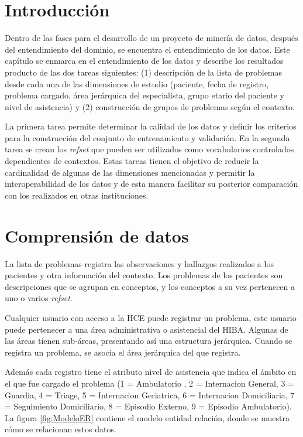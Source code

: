 \section{Introducción}
Dentro de las fases para el desarrollo de un proyecto de minería de datos, después del entendimiento del dominio, se encuentra el entendimiento de los datos. Este capítulo se enmarca en el entendimiento de los datos y describe los resultados producto de las dos tareas siguientes: (1) descripción de la lista de problemas desde cada una de las dimensiones de estudio (paciente, fecha de registro, problema cargado, área jerárquica del especialista, grupo etario del paciente y nivel de asistencia) y (2) construcción de grupos de problemas según el contexto. 

La primera tarea permite determinar la calidad de los datos y definir los criterios para la construcción del conjunto de entrenamiento y validación. En la segunda tarea se crean los \textit{\acrshort{refset}} que pueden ser utilizados como vocabularios controlados dependientes de contextos. Estas tareas  tienen el objetivo de reducir la cardinalidad de algunas de las dimensiones mencionadas y permitir la interoperabilidad de los datos y de esta manera facilitar su posterior comparación con los realizados en otras instituciones.

\section{Comprensión de datos}
La lista de problemas registra las observaciones y hallazgos realizados a los pacientes y otra información del contexto. Los problemas de los pacientes son descripciones que se agrupan en conceptos, y los conceptos a su vez pertenecen a uno o varios \textit{\acrshort{refset}}.

Cualquier usuario con acceso a la \acrshort{HCE} puede registrar un problema, este usuario puede pertenecer a una área administrativa o asistencial del \acrshort{HIBA}. Algunas de las áreas tienen sub-áreas, presentando así una estructura jerárquica. Cuando se registra un problema, se asocia el área jerárquica del que registra.

Además cada registro tiene el atributo nivel de asistencia que indica el ámbito en el que fue cargado el problema (1 = Ambulatorio , 2 = Internacion General, 3 = Guardia, 4 = Triage, 5 = Internacion Geriatrica, 6 = Internacion Domiciliaria, 7 = Seguimiento Domiciliario, 8 = Episodio Externo, 9 = Episodio Ambulatorio). La figura \ref{fig:ModeloER} contiene el modelo entidad relación, donde se muestra cómo se relacionan estos datos.

